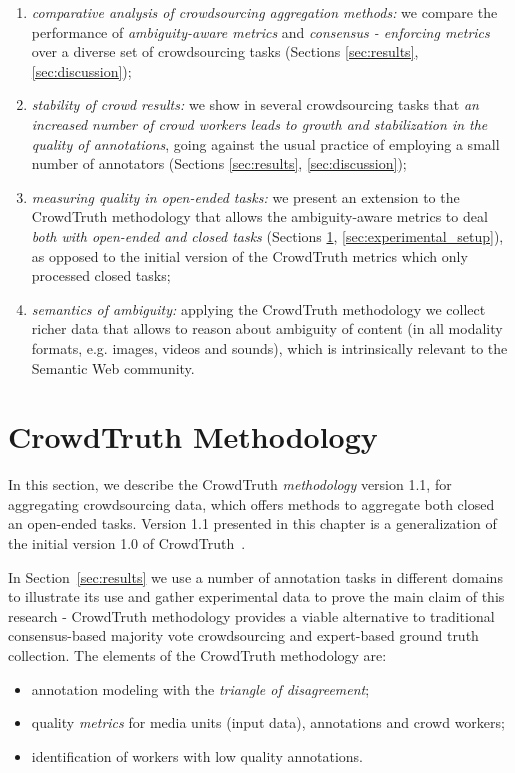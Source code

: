 \begin{enumerate}

\item \textit{comparative analysis of crowdsourcing aggregation methods:} we compare the performance of \textit{ambiguity-aware metrics} and \textit{consensus - enforcing metrics} over a diverse set of crowdsourcing tasks (Sections \ref{sec:results}, \ref{sec:discussion});

\item \textit{stability of crowd results:} we show in several crowdsourcing tasks that \textit{an increased number of crowd workers leads to growth and stabilization in the quality of annotations}, going against the usual practice of employing a small number of annotators (Sections \ref{sec:results}, \ref{sec:discussion});

\item \textit{measuring quality in open-ended tasks:} we present an extension to the CrowdTruth methodology that allows the ambiguity-aware metrics to deal \textit{both with open-ended and closed tasks} (Sections \ref{sec:methodology}, \ref{sec:experimental_setup}), as opposed to the initial version of the CrowdTruth metrics which only processed closed tasks;

\item \textit{semantics of ambiguity:} applying the CrowdTruth methodology we collect richer data that allows to reason about ambiguity of content (in all modality formats, e.g. images, videos and sounds), which is intrinsically relevant to the Semantic Web community.

\end{enumerate}


\section{CrowdTruth Methodology}
\label{sec:methodology}

In this section, we describe the CrowdTruth \textit{methodology} version 1.1, for aggregating crowdsourcing data, which offers methods to aggregate both closed an open-ended tasks. Version 1.1 presented in this chapter is a generalization of the initial version 1.0 of CrowdTruth~\cite{inel2014crowdtruth}.

In Section~\ref{sec:results} we use a number of annotation tasks in different domains  to illustrate its use and gather experimental data to prove the main claim of this research - CrowdTruth methodology provides a viable alternative to traditional consensus-based majority vote crowdsourcing and expert-based ground truth collection. The elements of the CrowdTruth methodology are:
\begin{itemize}
\item annotation modeling with the \emph{triangle of disagreement};
\item quality \emph{metrics} for media units (input data), annotations and crowd workers;
\item identification of workers with low quality annotations.
\end{itemize}

